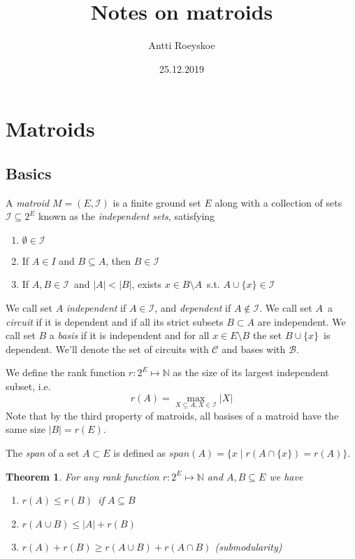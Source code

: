 \documentclass{article}
\title{Notes on matroids}
\author{Antti Roeyskoe}
\date{25.12.2019}
\newtheorem{theorem}{Theorem}[section]
\begin{document}
\begin{titlepage}
\maketitle
\end{titlepage}
\newpage

\section{Matroids}
\subsection{Basics}
A \textit{matroid} $M = (E, \mathcal{I})$ is a finite ground set $E$ along with a collection of sets $\mathcal{I} \subseteq 2^{E}$ known as the \textit{independent sets}, satisfying
\begin{enumerate}
	\item $\emptyset \in \mathcal{I}$
	\item If $A \in I$ and $B \subseteq A$, then $B \in \mathcal{I}$
	\item If $A, B \in \mathcal{I}$ and $|A| < |B|$, exists $x \in B \setminus A$ s.t. $A \cup \{x\} \in \mathcal{I}$
\end{enumerate}
We call set $A$ \textit{independent} if $A \in \mathcal{I}$, and \textit{dependent} if $A \not\in \mathcal{I}$.
We call set $A$ a \textit{circuit} if it is dependent and if all its strict subsets $B \subset A$ are independent.
We call set $B$ a \textit{basis} if it is independent and for all $x \in E \setminus B$ the set $B \cup \{x\}$ is dependent.
We'll denote the set of circuits with $\mathcal{C}$ and bases with $\mathcal{B}$.

We define the rank function $r : 2^{E} \mapsto \mathbb{N}$ as the size of its largest independent subset, i.e.
\begin{equation*}
r(A) = \max_{X \subseteq A, X \in \mathcal{I}} |X|
\end{equation*}
Note that by the third property of matroids, all basises of a matroid have the same size $|B| = r(E)$.

The \textit{span} of a set $A \subset E$ is defined as $span(A) = \{x \mid r(A \cap \{x\}) = r(A)\}$.

\begin{theorem}
For any rank function $r : 2^{E} \mapsto \mathbb{N}$ and $A, B \subseteq E$ we have
\begin{enumerate}
	\item $r(A) \leq r(B)$ if $A \subseteq B$
	\item $r(A \cup B) \leq |A| + r(B)$
	\item $r(A) + r(B) \geq r(A \cup B) + r(A \cap B)$ (submodularity)
\end{enumerate}
\end{theorem}
\end{document}
